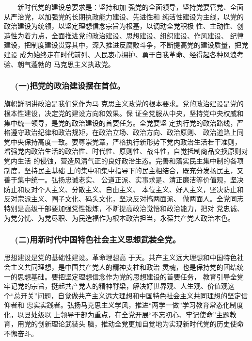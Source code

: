 \documentclass[11pt]{ctexart}
\begin{document}
{{{{　　新时代党的建设总要求是：坚持和加
强党的全面领导，坚持党要管党、全面从严治党，以加强党的长期执政能力建设、先进性和
纯洁性建设为主线，以党的政治建设为统领，以坚定理想信念宗旨为根基，以调动全党积极
性、主动性、创造性为着力点，全面推进党的政治建设、思想建设、组织建设、作风建设、
纪律建设，把制度建设贯穿其中，深入推进反腐败斗争，不断提高党的建设质量，把党建设
成为始终走在时代前列、人民衷心拥护、勇于自我革命、经得起各种风浪考验、朝气蓬勃的
马克思主义执政党。

\subsubsection{　 (一)把党的政治建设摆在首位。}
\label{sec:orga2a837d}

旗帜鲜明讲政治是我们党作为马
克思主义政党的根本要求。党的政治建设是党的根本性建设，决定党的建设方向和效果。保
证全党服从中央，坚持党中央权威和集中统一领导，是党的政治建设的首要任务。全党要坚
定执行党的政治路线，严格遵守政治纪律和政治规矩，在政治立场、政治方向、政治原则、
政治道路上同党中央保持高度一致。要尊崇党章，严格执行新形势下党内政治生活若干准则，
增强党内政治生活的政治性、时代性、原则性、战斗性，自觉抵制商品交换原则对党内生活
的侵蚀，营造风清气正的良好政治生态。完善和落实民主集中制的各项制度，坚持民主基础
上的集中和集中指导下的民主相结合，既充分发扬民主，又善于集中统一。弘扬忠诚老实、
公道正派、实事求是、清正廉洁等价值观，坚决防止和反对个人主义、分散主义、自由主义、
本位主义、好人主义，坚决防止和反对宗派主义、圈子文化、码头文化，坚决反对搞两面派、
做两面人。全党同志特别是高级干部要加强党性锻炼，不断提高政治觉悟和政治能力，把对
党忠诚、为党分忧、为党尽职、为民造福作为根本政治担当，永葆共产党人政治本色。
　
\subsubsection{　  (二)用新时代中国特色社会主义思想武装全党。}
\label{sec:orgcbbb2f9}

思想建设是党的基础性建设。革命理想高
于天。共产主义远大理想和中国特色社会主义共同理想，是中国共产党人的精神支柱和政治
灵魂，也是保持党的团结统一的思想基础。要把坚定理想信念作为党的思想建设的首要任务，
教育引导全党牢记党的宗旨，挺起共产党人的精神脊梁，解决好世界观、人生观、价值观这
个“总开关”问题，自觉做共产主义远大理想和中国特色社会主义共同理想的坚定信仰者和
忠实实践者。弘扬马克思主义学风，推进“两学一做”学习教育常态化制度化，以县处级以
上领导干部为重点，在全党开展“不忘初心、牢记使命”主题教育，用党的创新理论武装头
脑，推动全党更加自觉地为实现新时代党的历史使命不懈奋斗。

}}}}
\end{document}
